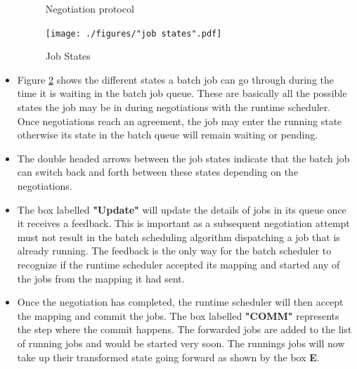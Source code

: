 \begin{itemize}
\begin{figure}[!htbp]
\caption{Negotiation protocol}
\label{fig:2}
\end{figure}
\begin{figure}[!htbp]
\centering
\texttt{[image: ./figures/"job states".pdf]}
\caption{Job States}
\label{fig:53}
\end{figure}
\item Figure \ref{fig:53} shows the different states a batch job can go through during the time it is waiting in the batch job queue. These are basically all the possible states the job may be in during negotiations with the runtime scheduler. Once negotiations reach an agreement, the job may enter the running state otherwise its state in the batch queue will remain waiting or pending.
\item The double headed arrows between the job states indicate that the batch job can switch back and forth between these states depending on the negotiations.
\item The box labelled \textbf{"Update"} will update the details of jobs in its queue once it receives a feedback. This is important as a subsequent negotiation attempt must not result in the batch scheduling algorithm dispatching a job that is already running. The feedback is the only way for the batch scheduler to recognize if the runtime scheduler accepted its mapping and started any of the jobs from the mapping it had sent.  
\item Once the negotiation has completed, the runtime scheduler will then accept the mapping and commit the jobs. The box labelled \textbf{"COMM"} represents the step where the commit happens. The forwarded jobs are added to the list of running jobs and would be started very soon. The runnings jobs will now take up their transformed state going forward as shown by the box \textbf{E}.
\end{itemize}
